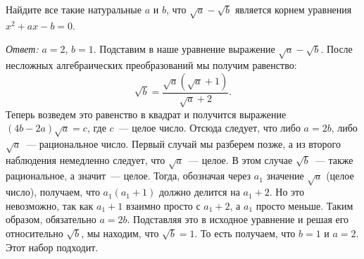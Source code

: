 \problem
Найдите все такие натуральные $a$ и $b$, что $\sqrt{a} - \sqrt{b}$ является
корнем уравнения $x^2 + a x - b = 0$.

\solution
\emph{Ответ:} $a = 2$, $b = 1$.
Подставим в наше уравнение выражение $\sqrt{a} - \sqrt{b}$.
После несложных алгебраических преобразований мы получим равенство: 
\[
    \sqrt{b}
=
    \frac{\sqrt{a}(\sqrt{a} + 1)}{\sqrt{a} + 2}
.\]
Теперь возведем это равенство в квадрат и получится выражение
$(4 b - 2 a) \sqrt{a} = c$, где $c$~--- целое число.
Отсюда следует, что либо $a = 2 b$, либо $\sqrt{a}$~--- рациональное число.
Первый случай мы разберем позже, а из второго наблюдения немедленно следует,
что $\sqrt{a}$~--- целое.
В этом случае $\sqrt{b}$~--- также рациональное, а значит~--- целое.
Тогда, обозначая через $a_1$ значение $\sqrt{a}$ (целое число), получаем, что
$a_1 (a_1 + 1)$ должно делится на $a_1 + 2$.
Но это невозможно, так как $a_1 + 1$ взаимно просто с $a_1 + 2$, а $a_1$ просто
меньше.
Таким образом, обязательно $a = 2 b$.
Подставляя это в исходное уравнение и решая его относительно $\sqrt{b}$, мы
находим, что $\sqrt{b} = 1$.
То есть получаем, что $b = 1$ и $a = 2$.
Этот набор подходит.
\endproblem

